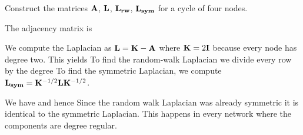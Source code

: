 Construct the matrices $\bf A$, $\bf L$, $\bf L_{rw}$, $\bf L_{sym}$ for a cycle of four nodes. 

\solution
The adjacency matrix is 

We compute the Laplacian as ${\bf L}={\bf K}-{\bf A}$ where ${\bf K}=2{\bf I}$ because every node has degree two. This yields   
To find the random-walk Laplacian we divide every row by the degree
To find the symmetric Laplacian, we compute ${\bf L_{sym}}={\bf K}^{-1/2} {\bf L} {\bf K}^{-1/2}$.

We have 
and hence 
Since the random walk Laplacian was already symmetric it is identical to the symmetric Laplacian. This happens in every network where the components are degree regular. 
